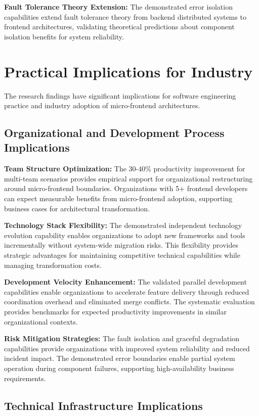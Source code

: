 \documentclass[12pt,a4paper]{report}
\begin{document}
\textbf{Fault Tolerance Theory Extension:} The demonstrated error isolation capabilities extend fault tolerance theory from backend distributed systems to frontend architectures, validating theoretical predictions about component isolation benefits for system reliability.

\section{Practical Implications for Industry}

The research findings have significant implications for software engineering practice and industry adoption of micro-frontend architectures.

\subsection{Organizational and Development Process Implications}

\textbf{Team Structure Optimization:} The 30-40\% productivity improvement for multi-team scenarios provides empirical support for organizational restructuring around micro-frontend boundaries. Organizations with 5+ frontend developers can expect measurable benefits from micro-frontend adoption, supporting business cases for architectural transformation.

\textbf{Technology Stack Flexibility:} The demonstrated independent technology evolution capability enables organizations to adopt new frameworks and tools incrementally without system-wide migration risks. This flexibility provides strategic advantages for maintaining competitive technical capabilities while managing transformation costs.

\textbf{Development Velocity Enhancement:} The validated parallel development capabilities enable organizations to accelerate feature delivery through reduced coordination overhead and eliminated merge conflicts. The systematic evaluation provides benchmarks for expected productivity improvements in similar organizational contexts.

\textbf{Risk Mitigation Strategies:} The fault isolation and graceful degradation capabilities provide organizations with improved system reliability and reduced incident impact. The demonstrated error boundaries enable partial system operation during component failures, supporting high-availability business requirements.

\subsection{Technical Infrastructure Implications}
\end{document}
